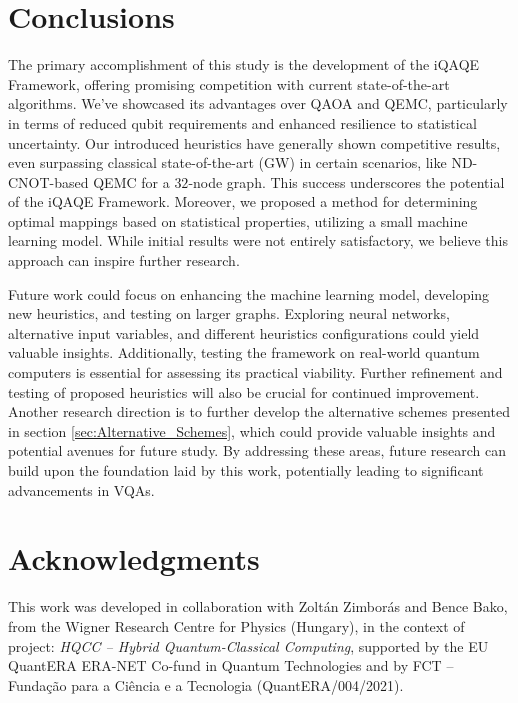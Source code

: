 \section{Conclusions}
\label{sec:Conclusions}
The primary accomplishment of this study is the development of the iQAQE Framework, offering promising competition with current state-of-the-art algorithms. We've showcased its advantages over QAOA and QEMC, particularly in terms of reduced qubit requirements and enhanced resilience to statistical uncertainty. Our introduced heuristics have generally shown competitive results, even surpassing classical state-of-the-art (GW) in certain scenarios, like ND-CNOT-based QEMC for a $32$-node graph. This success underscores the potential of the iQAQE Framework. Moreover, we proposed a method for determining optimal mappings based on statistical properties, utilizing a small machine learning model. While initial results were not entirely satisfactory, we believe this approach can inspire further research.

Future work could focus on enhancing the machine learning model, developing new heuristics, and testing on larger graphs. Exploring neural networks, alternative input variables, and different heuristics configurations could yield valuable insights. Additionally, testing the framework on real-world quantum computers is essential for assessing its practical viability. Further refinement and testing of proposed heuristics will also be crucial for continued improvement. Another research direction is to further develop the alternative schemes presented in section \ref{sec:Alternative_Schemes}, which could provide valuable insights and potential avenues for future study. By addressing these areas, future research can build upon the foundation laid by this work, potentially leading to significant advancements in VQAs.

\section*{Acknowledgments}
\label{sec:Acknowledgments}
This work was developed in collaboration with Zoltán Zimborás and Bence Bako, from the Wigner Research Centre for Physics (Hungary), in the context of project: \textit{HQCC – Hybrid Quantum-Classical Computing}, supported by the EU QuantERA ERA-NET Co-fund in Quantum Technologies and by FCT -- Funda\c{c}\~{a}o para a Ci\^{e}ncia e a Tecnologia (QuantERA/004/2021).



\nocite{Tabi_2020,nielsen2010quantum,sciorilli2024largescale,Karp2010,NP-problems}